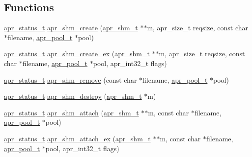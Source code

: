 \subsection*{Functions}
\begin{DoxyCompactItemize}
\item 
\hyperlink{group__apr__errno_gaf76ee4543247e9fb3f3546203e590a6c}{apr\-\_\-status\-\_\-t} \hyperlink{group__apr__shm_gac370c4943c22505ce2b0d57c51805480}{apr\-\_\-shm\-\_\-create} (\hyperlink{group__apr__shm_ga79e8c16bdeaf7ade4ef0f935249e7c2f}{apr\-\_\-shm\-\_\-t} $\ast$$\ast$m, apr\-\_\-size\-\_\-t reqsize, const char $\ast$filename, \hyperlink{group__apr__pools_gaf137f28edcf9a086cd6bc36c20d7cdfb}{apr\-\_\-pool\-\_\-t} $\ast$pool)
\item 
\hyperlink{group__apr__errno_gaf76ee4543247e9fb3f3546203e590a6c}{apr\-\_\-status\-\_\-t} \hyperlink{group__apr__shm_ga21baaa66956641e06e072501f61882e7}{apr\-\_\-shm\-\_\-create\-\_\-ex} (\hyperlink{group__apr__shm_ga79e8c16bdeaf7ade4ef0f935249e7c2f}{apr\-\_\-shm\-\_\-t} $\ast$$\ast$m, apr\-\_\-size\-\_\-t reqsize, const char $\ast$filename, \hyperlink{group__apr__pools_gaf137f28edcf9a086cd6bc36c20d7cdfb}{apr\-\_\-pool\-\_\-t} $\ast$pool, apr\-\_\-int32\-\_\-t flags)
\item 
\hyperlink{group__apr__errno_gaf76ee4543247e9fb3f3546203e590a6c}{apr\-\_\-status\-\_\-t} \hyperlink{group__apr__shm_gaee8b7d9b952ff6157ddbb00fabb477e0}{apr\-\_\-shm\-\_\-remove} (const char $\ast$filename, \hyperlink{group__apr__pools_gaf137f28edcf9a086cd6bc36c20d7cdfb}{apr\-\_\-pool\-\_\-t} $\ast$pool)
\item 
\hyperlink{group__apr__errno_gaf76ee4543247e9fb3f3546203e590a6c}{apr\-\_\-status\-\_\-t} \hyperlink{group__apr__shm_ga7de5b65a9c7d9840bfa289854f8d59d4}{apr\-\_\-shm\-\_\-destroy} (\hyperlink{group__apr__shm_ga79e8c16bdeaf7ade4ef0f935249e7c2f}{apr\-\_\-shm\-\_\-t} $\ast$m)
\item 
\hyperlink{group__apr__errno_gaf76ee4543247e9fb3f3546203e590a6c}{apr\-\_\-status\-\_\-t} \hyperlink{group__apr__shm_ga0e542941c280cb72b78e30d452464759}{apr\-\_\-shm\-\_\-attach} (\hyperlink{group__apr__shm_ga79e8c16bdeaf7ade4ef0f935249e7c2f}{apr\-\_\-shm\-\_\-t} $\ast$$\ast$m, const char $\ast$filename, \hyperlink{group__apr__pools_gaf137f28edcf9a086cd6bc36c20d7cdfb}{apr\-\_\-pool\-\_\-t} $\ast$pool)
\item 
\hyperlink{group__apr__errno_gaf76ee4543247e9fb3f3546203e590a6c}{apr\-\_\-status\-\_\-t} \hyperlink{group__apr__shm_ga088260723c96815610ff628f358d3630}{apr\-\_\-shm\-\_\-attach\-\_\-ex} (\hyperlink{group__apr__shm_ga79e8c16bdeaf7ade4ef0f935249e7c2f}{apr\-\_\-shm\-\_\-t} $\ast$$\ast$m, const char $\ast$filename, \hyperlink{group__apr__pools_gaf137f28edcf9a086cd6bc36c20d7cdfb}{apr\-\_\-pool\-\_\-t} $\ast$pool, apr\-\_\-int32\-\_\-t flags)

\end{DoxyCompactItemize}

